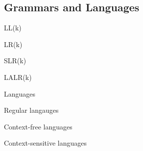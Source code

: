 \subsection{Grammars and Languages}

LL(k)

LR(k)

SLR(k)

LALR(k)

Languages

Regular langauges

Context-free languages

Context-sensitive languages

